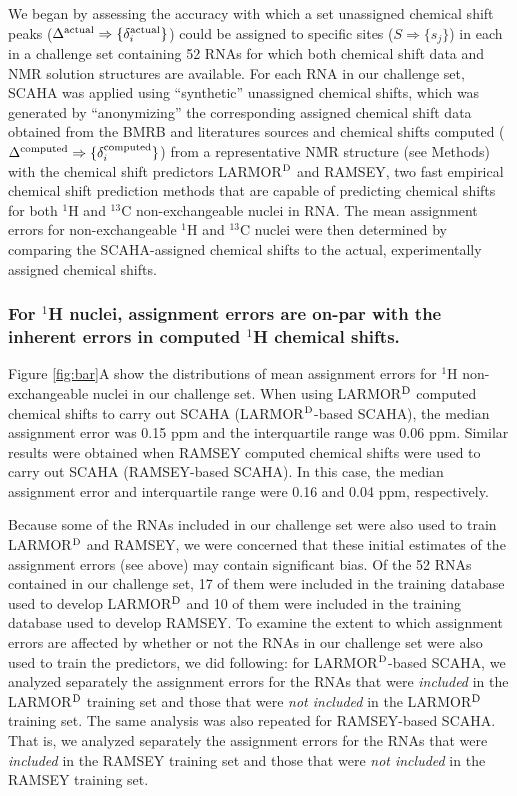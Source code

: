 \documentclass[journal=jcisd8,manuscript=article,layout=onecolumn]{achemso}
\begin{document}
We began by assessing the accuracy with which a set unassigned chemical shift peaks ($\Delta^{\rm actual}\Rightarrow\{\delta_{i}^{\rm actual}\}$) could be assigned to specific sites ($S\Rightarrow\{s_{j}\}$) in each in a challenge set containing 52 RNAs for which both chemical shift data and NMR solution structures are available. For each RNA in our challenge set, SCAHA was applied using ``synthetic'' unassigned chemical shifts, which was generated by ``anonymizing''  the corresponding assigned chemical shift data obtained from the BMRB and literatures sources and chemical shifts computed ($\Delta^{\rm computed}\Rightarrow\{\delta_{i}^{\rm computed}\}$) from a representative NMR structure (see Methods) with the chemical shift predictors LARMOR$^{\rm D}$ and RAMSEY, two fast empirical chemical shift prediction methods  that are capable of predicting chemical shifts for both $^{1}$H and $^{13}$C non-exchangeable nuclei in RNA. The mean assignment errors for non-exchangeable $^{1}$H and $^{13}$C nuclei were then determined by comparing the SCAHA-assigned chemical shifts to the actual, experimentally assigned chemical shifts.
	
\subsubsection{For $^{1}$H nuclei, assignment errors are on-par with the inherent errors in computed $^{1}$H chemical shifts.}  Figure \ref{fig:bar}A show the distributions of mean assignment errors for $^{1}$H non-exchangeable nuclei in our challenge set. When using LARMOR$^{\rm D}$ computed chemical shifts to carry out SCAHA (LARMOR$^{\rm D}$-based SCAHA), the median assignment error was 0.15 ppm and the interquartile range was 0.06 ppm. Similar results were obtained when RAMSEY computed chemical shifts were used to carry out SCAHA (RAMSEY-based SCAHA). In this case, the median assignment error and interquartile range were 0.16 and 0.04 ppm, respectively. 

Because some of the RNAs included in our challenge set were also used to train LARMOR$^{\rm D}$ and RAMSEY, we were concerned that these initial estimates of the assignment errors (see above) may contain significant bias. Of the 52 RNAs contained in our challenge set, 17 of them were included in the training database used to develop LARMOR$^{\rm D}$ and 10 of them were included in the training database used to develop RAMSEY. To examine the extent to which assignment errors are affected by whether or not the RNAs in our challenge set were also used to train the predictors, we did following: for LARMOR$^{\rm D}$-based SCAHA, we analyzed separately the assignment errors for the RNAs that were \textit{included} in the LARMOR$^{\rm D}$ training set and those that were \textit{not included} in the LARMOR$^{\rm D}$ training set. The same analysis was also repeated for RAMSEY-based SCAHA. That is, we analyzed separately the assignment errors for the RNAs that were \textit{included} in the RAMSEY training set and those that were \textit{not included} in the RAMSEY training set.
\end{document}
